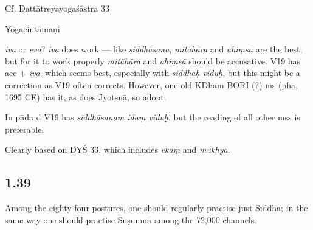 \begin{ekdosis}
\begin{sources}[hp01_038]
Cf. Dattātreyayogaśāstra 33

\begin{versinnote}
\end{versinnote}

\end{sources}

\begin{testimonia}[hp01_038]
Yogacintāmaṇi

\begin{versinnote}
\end{versinnote}

\end{testimonia}

\begin{philcomm}[hp01_038]
\emph{iva} or \emph{eva}? \emph{iva} does work — like \emph{siddhāsana}, \emph{mitāhāra} and \emph{ahiṃsā} are the best, but for it to work properly \emph{mitāhāra} and \emph{ahiṃsā} should be accusative. V19 has acc + \emph{iva}, which seems best, especially with \emph{siddhāḥ viduḥ}, but this might be a correction as V19 often corrects. However, one old KDham BORI (?) ms (pha, 1695 CE) has it, as does Jyotsnā, so adopt.

In pāda d V19 has \emph{siddhāsanam idaṃ viduḥ}, but the reading of all other mss is preferable.

Clearly based on DYŚ 33, which includes \emph{ekaṃ} and \emph{mukhya}.
\end{philcomm}

\subsection*{1.39}
\begin{translation}[hp01_039]
Among the eighty-four postures, one should regularly practise just Siddha; in the same way one should practise Suṣumnā among the 72,000 channels.
\end{translation}

\begin{sources}[hp01_039]
\end{sources}


\end{ekdosis}
